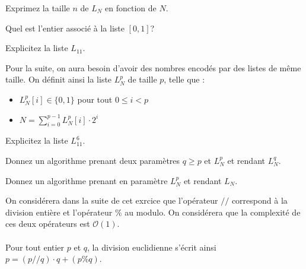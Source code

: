 \begin{exo}
\begin{partie}
\begin{questionpartie} 
Exprimez la taille $n$ de $L_N$ en fonction de $N$.
\end{questionpartie}

\begin{questionpartie} 
Quel est l'entier associé à la liste $[0, 1]$?
\end{questionpartie}

\begin{questionpartie} 
Explicitez la liste $L_{11}$.
\end{questionpartie}

Pour la suite, on aura besoin d'avoir des nombres encodés par des listes de même taille. On définit ainsi la liste $L_N^p$ de taille $p$, telle que :

\begin{itemize}
\item $L^p_N[i] \in \{0, 1\}$ pour tout $0\leq i < p$
\item $N = \sum_{i=0}^{p-1}L^p_N[i]\cdot 2^i$
\end{itemize}

\begin{questionpartie} 
Explicitez la liste $L_{11}^6$.
\end{questionpartie}

\begin{questionpartie} 
Donnez un algorithme prenant deux paramètres $q \geq p$ et $L_N^p$ et rendant $L_N^q$.
\end{questionpartie}

\begin{questionpartie} 
Donnez un algorithme prenant en paramètre $L_N^p$ et rendant $L_N$.
\end{questionpartie}
\end{partie}

\begin{partie}[Conversions]

On considérera dans la suite de cet exrcice que l'opérateur $//$ correspond à la division entière et l'opérateur $\%$ au modulo. On considérera que la complexité de ces deux opérateurs est $\mathcal{O}(1)$.


\paragraph{}Pour tout entier $p$ et $q$, la division euclidienne s'écrit ainsi $p = (p//q) \cdot q + (p \% q)$.


\end{partie}
\end{exo}
